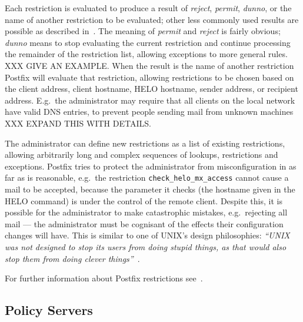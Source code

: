 Each restriction is evaluated to produce a result of \textit{reject},
\textit{permit}, \textit{dunno}, or the name of another restriction to be
evaluated; other less commonly used results are possible as described
in~\cite{smtpd_access_readme,smtpd_per_user_control,policy-servers}. The
meaning of \textit{permit\/} and \textit{reject\/} is fairly obvious;
\textit{dunno\/} means to stop evaluating the current restriction and
continue processing the remainder of the restriction list, allowing
exceptions to more general rules.  XXX GIVE AN EXAMPLE\@.  When the result
is the name of another restriction Postfix will evaluate that restriction,
allowing restrictions to be chosen based on the client 
address, client hostname, HELO hostname, sender address, or recipient
address.  E.g.\ the administrator may require that all clients on the local
network have valid DNS entries, to prevent people sending mail from unknown
machines XXX EXPAND THIS WITH DETAILS\@.

The administrator can define new restrictions as a list of existing
restrictions, allowing arbitrarily long and complex sequences of lookups,
restrictions and exceptions.  Postfix tries to protect the administrator
from misconfiguration in as far as is reasonable, e.g.\ the restriction
\texttt{check\_helo\_mx\_access} cannot cause a mail to be accepted,
because the parameter it checks (the hostname given in the HELO command) is
under the control of the remote client.  Despite this, it is possible for
the administrator to make catastrophic mistakes, e.g.\ rejecting all mail
--- the administrator must be cognisant of the effects their configuration
changes will have.  This is similar to one of UNIX's design philosophies:
\textit{``UNIX was not designed to stop its users from doing stupid things,
as that would also stop them from doing clever
things''\/}~\cite{unix-philosophy}.

For further information about Postfix restrictions
see~\cite{smtpd_access_readme,smtpd_per_user_control,policy-servers}.

\subsection{Policy Servers}

\label{policy servers}

